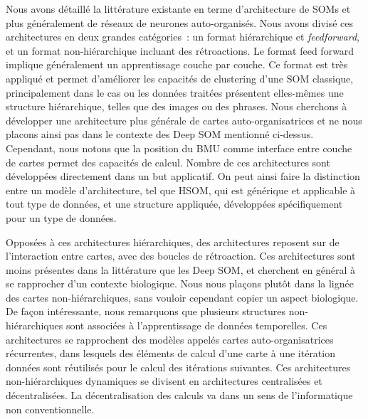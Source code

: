 \documentclass[../main]{subfiles}
\begin{document}
Nous avons détaillé la littérature existante en terme d'architecture de SOMs et plus généralement de réseaux de neurones auto-organisés. Nous avons divisé ces architectures en deux grandes catégories~: un format hiérarchique et \emph{feedforward}, et un format non-hiérarchique incluant des rétroactions.
Le format feed forward implique généralement un apprentissage couche par couche. Ce format est très appliqué et permet d'améliorer les capacités de clustering d'une SOM classique, principalement dans le cas ou les données traitées présentent elles-mêmes une structure hiérarchique, telles que des images ou des phrases.
Nous cherchons à développer une architecture plus générale de cartes auto-organisatrices et ne nous placons ainsi pas dans le contexte des Deep SOM mentionné ci-dessus. 
Cependant, nous notons que la position du BMU comme interface entre couche de cartes permet des capacités de calcul.
Nombre de ces architectures sont développées directement dans un but applicatif. On peut ainsi faire la distinction entre un modèle d'architecture, tel que HSOM, qui est générique et applicable à tout type de données, et une structure appliquée, développées spécifiquement pour un type de données.

Opposées à ces architectures hiérarchiques, des architectures reposent sur de l'interaction entre cartes, avec des boucles de rétroaction.
Ces architectures sont moins présentes dans la littérature que les Deep SOM, et cherchent en général à se rapprocher d'un contexte biologique.
Nous nous plaçons plutôt dans la lignée des cartes non-hiérarchiques, sans vouloir cependant copier un aspect biologique.
De façon intéressante, nous remarquons que plusieurs structures non-hiérarchiques sont associées à l'apprentissage de données temporelles. Ces architectures se rapprochent des modèles appelés cartes auto-organisatrices récurrentes, dans lesquels des éléments de calcul d'une carte à une itération données sont réutilisés pour le calcul des itérations suivantes.
Ces architectures non-hiérarchiques dynamiques se divisent en architectures centralisées et décentralisées. La décentralisation des calculs va dans un sens de l'informatique non conventionnelle.
\end{document}
